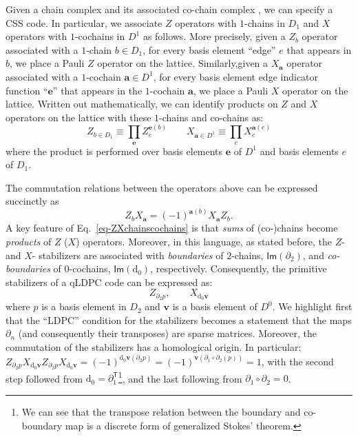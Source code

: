 \documentclass[aps,prx,reprint,superscriptaddress,nofootinbib]{revtex4-2}
\theoremstyle{definition}
\newcommand{\exd}{\text{d}}
\newcommand{\<}{\langle}
\renewcommand{\>}{\rangle}
\begin{document}
Given a chain complex and its associated co-chain complex , we can specify a CSS code.
%
In particular, we associate $Z$ operators with $1$-chains in $D_1$ and $X$ operators with $1$-cochains in $D^1$ as follows.
%
More precisely, given a $Z_b$ operator associated with a $1$-chain $b \in D_1$, for every basis element ``edge'' $e$ that appears in $b$, we place a Pauli $Z$ operator on the lattice.
%
Similarly,given a $X_{\mathbf{a}}$ operator associated with a $1$-cochain $\mathbf{a} \in D^1$, for every basis element edge indicator function ``$\mathbf{e}$'' that appears in the $1$-cochain $\mathbf{a}$, we place a Pauli $X$ operator on the lattice.
%
Written out mathematically, we can identify products on $Z$ and $X$ operators on the lattice with these $1$-chains and co-chains as:
\begin{equation} \label{eq-ZXchainscochains}
    Z_{b \in D_1} \equiv \prod_{\mathbf{e}} Z_e^{\mathbf{e}(b)}
    \qquad
    X_{\mathbf{a} \in D^1} \equiv \prod_{e} X_{e}^{\mathbf{a}(e)}
\end{equation} 
%
where the product is performed over basis elements $\mathbf{e}$ of $D^1$ and basis elements $e$ of $D_1$.
%



The commutation relations between the operators above can be expressed succinctly as
\begin{equation}
Z_{b} X_{\mathbf{a}} = (-1)^{\mathbf{a}(b)} X_{\mathbf{a}} Z_{b}.    
\end{equation}
%
A key feature of Eq.~\eqref{eq-ZXchainscochains} is that \textit{sums} of (co-)chains become \textit{products} of $Z$ ($X$) operators.
%
Moreover, in this language, as stated before, the $Z$- and $X$- stabilizers are associated with \textit{boundaries} of $2$-chains, $\mathsf{Im}(\partial_2)$, and \textit{co-boundaries} of $0$-cochains, $\mathsf{Im}(\exd_0)$, respectively.
%
Consequently, the primitive stabilizers of a qLDPC code can be expressed as: 
\begin{equation} \label{eq-qLDPCstab}
    Z_{\partial_2 p}, \qquad X_{\exd_0 \mathbf{v}}
\end{equation}
where $p$ is a basis element in $D_2$ and $\mathbf{v}$ is a basis element of $D^0$.
%
We highlight first that the ``LDPC'' condition for the stabilizers becomes a statement that the maps $\partial_n$ (and consequently their transposes) are sparse matrices.
%
Moreover, the commutation of the stabilizers has a homological origin.
%
In particular: $Z_{\partial_2 p}X_{\exd_0 \mathbf{v}}Z_{\partial_2 p} X_{\exd_0 \mathbf{v}}  = (-1)^{\exd_0 \mathbf{v}(\partial_2 p)} = (-1)^{\mathbf{v}(\partial_1 \circ \partial_2 (p))} = 1$, with the second step followed from $\exd_0 = \partial_1^{\mathsf{T}}$\footnote{We can see that the transpose relation between the boundary and co-boundary map is a discrete form of generalized Stokes' theorem.}, and the last following from $\partial_1 \circ \partial_2 = 0$.
%
\end{document}
